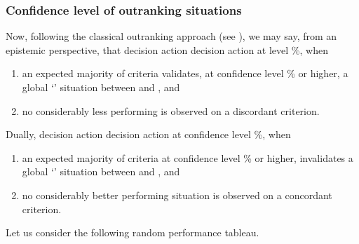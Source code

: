 \documentclass[a4paper,12pt,english]{sphinxhowto}
\begin{document}
\subsubsection{Confidence level of outranking situations}
\label{\detokenize{pearls:confidence-level-of-outranking-situations}}
\sphinxAtStartPar
Now, following the classical outranking approach (see  ), we may say, from an epistemic perspective, that decision action   decision action  at  level  \%, when
\begin{enumerate}
%
\item {} 
\sphinxAtStartPar
an expected majority of criteria validates, at confidence level  \% or higher, a global ‘’ situation between  and , and

\item {} 
\sphinxAtStartPar
no considerably less performing is observed on a discordant criterion.

\end{enumerate}

\sphinxAtStartPar
Dually, decision action   decision action  at
confidence level  \%, when
\begin{enumerate}
%
\item {} 
\sphinxAtStartPar
an expected majority of criteria at confidence level  \% or higher, invalidates a global ‘’ situation between  and , and

\item {} 
\sphinxAtStartPar
no considerably better performing situation is observed on a concordant criterion.

\end{enumerate}

\sphinxAtStartPar
{}

\sphinxAtStartPar
Let us consider the following random performance tableau.
\end{document}
